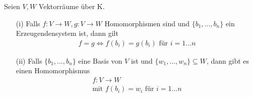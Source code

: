 \documentclass[11pt]{report}
\begin{document}
\begin{lemma}
 \label{lemma411}
Seien $V,W$ Vektorräume über K.
\begin{itemize}
 \item[(i)] Falls $f: V \rightarrow W, g: V \rightarrow W$ Homomorphismen sind und $\{b_1, ..., b_n\}$ ein Erzeugendensystem ist, dann gilt
\begin{align}
 f = g \Leftrightarrow f(b_i) = g(b_i) \text{ für } i=1...n
\end{align}

 \item[(ii)] Falls $\{b_1, ..., b_n\}$ eine Basis von $V$ ist und $\{w_1, ..., w_n\} \subseteq W$, dann gibt es einen Homomorphismus
\begin{align}
 f: V \rightarrow W \\
  \text{mit } f(b_i) = w_i \text{ für } i = 1...n
\end{align}
\end{itemize}
\end{lemma}
\end{document}
